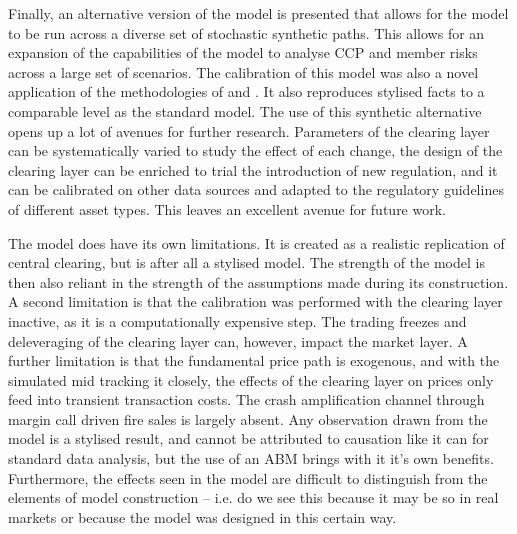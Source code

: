 Finally, an alternative version of the model is presented that allows for the model to be run across a diverse set of stochastic synthetic paths. This allows for an expansion of the capabilities of the model to analyse CCP and member risks across a large set of scenarios. The calibration of this model was also a novel application of the methodologies of \cite{lamperti_2018} and \cite{gao_2022_xgb}. It also reproduces stylised facts to a comparable level as the standard model. The use of this synthetic alternative opens up a lot of avenues for further research. Parameters of the clearing layer can be systematically varied to study the effect of each change, the design of the clearing layer can be enriched to trial the introduction of new regulation, and it can be calibrated on other data sources and adapted to the regulatory guidelines of different asset types. This leaves an excellent avenue for future work. 

The model does have its own limitations. It is created as a realistic replication of central clearing, but is after all a stylised model. The strength of the model is then also reliant in the strength of the assumptions made during its construction. A second limitation is that the calibration was performed with the clearing layer inactive, as it is a computationally expensive step. The trading freezes and deleveraging of the clearing layer can, however, impact the market layer. A further limitation is that the fundamental price path is exogenous, and with the simulated mid tracking it closely, the effects of the clearing layer on prices only feed into transient transaction costs. The crash amplification channel through margin call driven fire sales is largely absent. Any observation drawn from the model is a stylised result, and cannot be attributed to causation like it can for standard data analysis, but the use of an ABM brings with it it's own benefits. Furthermore, the effects seen in the model are difficult to distinguish from the elements of model construction -- i.e. do we see this because it may be so in real markets or because the model was designed in this certain way. 




